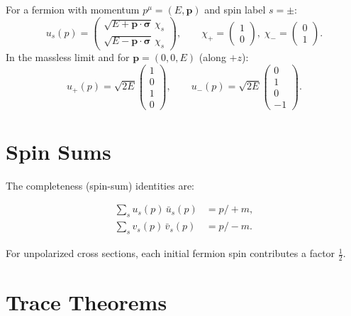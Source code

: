 \documentclass[12pt]{article}
\begin{document}
For a fermion with momentum $p^\mu=(E,\mathbf{p})$ and spin label $s=\pm$:
\begin{equation}
u_s(p) = \begin{pmatrix}
\sqrt{E+\mathbf{p}\cdot\boldsymbol{\sigma}}\,\chi_s \\
\sqrt{E-\mathbf{p}\cdot\boldsymbol{\sigma}}\,\chi_s
\end{pmatrix},
\qquad
\chi_+ = \begin{pmatrix}1\\0\end{pmatrix},\;
\chi_- = \begin{pmatrix}0\\1\end{pmatrix} .
\tag{39.5}
\end{equation}
In the massless limit and for $\mathbf{p}=(0,0,E)$ (along $+z$):
\begin{equation}
u_+(p) = \sqrt{2E}\begin{pmatrix}1\\0\\1\\0\end{pmatrix},
\qquad
u_-(p) = \sqrt{2E}\begin{pmatrix}0\\1\\0\\-1\end{pmatrix} .
\tag{39.6}
\end{equation}

\section{Spin Sums}\label{sec:spin_sums}

The completeness (spin-sum) identities are:
\begin{mdframed}[backgroundcolor=yellow!5]
\begin{align}
\sum_s u_s(p)\,\bar u_s(p) &= p\!\!\!/+m , \tag{39.8}\\
\sum_s v_s(p)\,\bar v_s(p) &= p\!\!\!/-m . \tag{39.9}
\end{align}
\end{mdframed}

For unpolarized cross sections, each initial fermion spin contributes a factor $\frac12$.

\section{Trace Theorems}\label{sec:traces}
\end{document}
